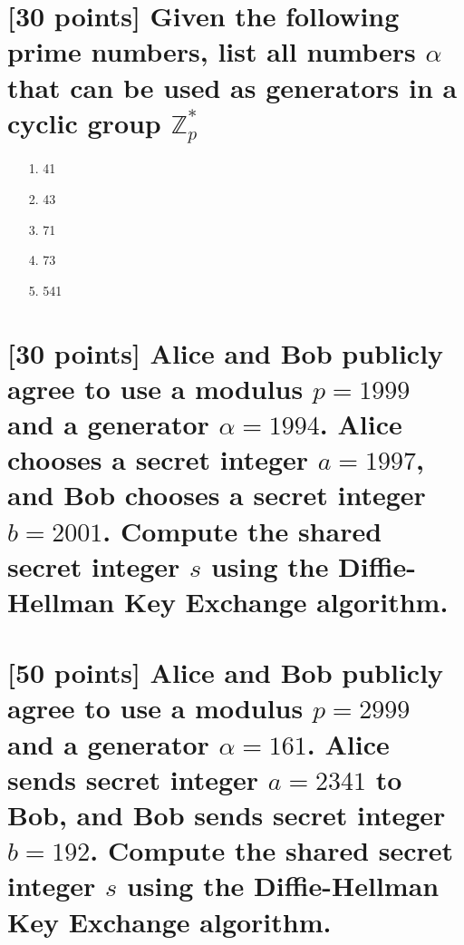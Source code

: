 \documentclass{article}
\begin{document}
\section*{[30 points] Given the following prime numbers, list all numbers $\alpha$ that can be used as generators in a cyclic group $\mathbb{Z}_p^{*}$}

\begin{enumerate}
 \item [1. ]41
 \item [2. ]43
 \item [3. ]71
 \item [4. ]73
 \item [5. ]541
\end{enumerate}

\section{[30 points] Alice and Bob publicly agree to use a modulus $p=1999$ and a generator $\alpha=1994$. Alice chooses a secret integer $a= 1997$, and Bob chooses a secret integer $b =  2001$. Compute the shared secret integer $s$ using the Diffie-Hellman Key Exchange algorithm. }


\section{[50 points] Alice and Bob publicly agree to use a modulus $p=2999$ and a generator $\alpha=161$. Alice sends  secret integer $a= 2341$ to Bob, and Bob sends secret integer $b =  192$. Compute the shared secret integer $s$ using the Diffie-Hellman Key Exchange algorithm. }
\end{document}
